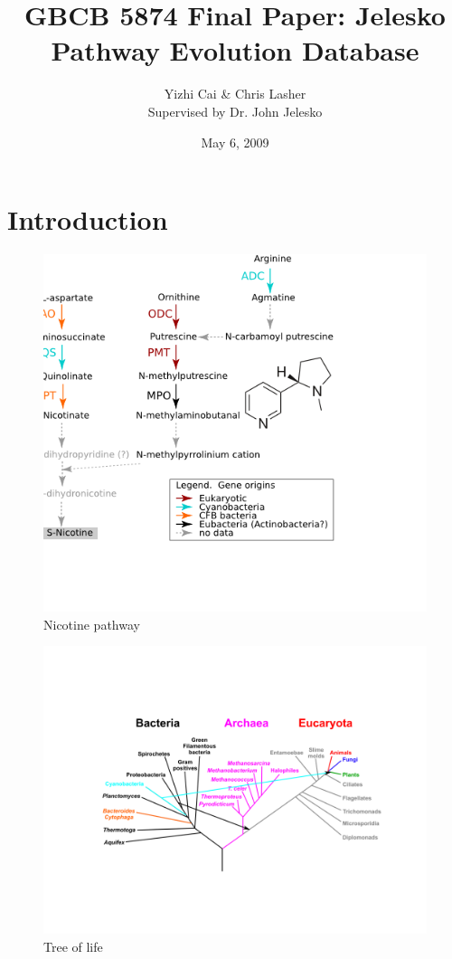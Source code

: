 \documentclass[11pt,letterpaper,twoside,english]{article}
\author{Yizhi Cai \& Chris Lasher\\
Supervised by Dr. John Jelesko}
\title{GBCB 5874 Final Paper: Jelesko Pathway Evolution Database}
\date{May 6, 2009}
\begin{document}
\maketitle

\section{Introduction}

%
\begin{figure}[btph]
\begin{centering}
\includegraphics[width=.65\linewidth]{figures/pyridine_alkaloid_biosynthesis}
\par\end{centering}

\caption{Nicotine pathway}

\end{figure}


%
\begin{figure}[h]
\begin{centering}
\includegraphics[width=1\linewidth]{figures/Tree_of_life}
\par\end{centering}

\caption{Tree of life}

\end{figure}
\end{document}
